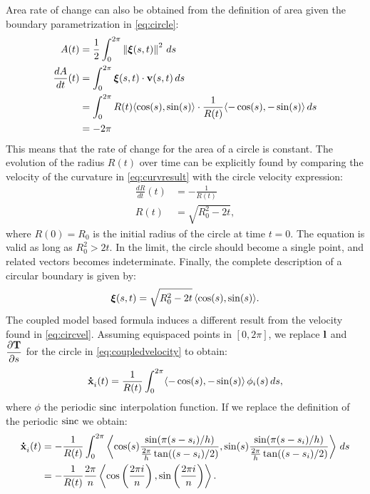 Area rate of change can also be obtained from the definition of area given the boundary parametrization in \eqref{eq:circle}:
\begin{align}
    A(t) &= \frac{1}{2} \int_0^{2\pi} \left\lVert\bm{\xi}(s,t)\right\rVert^2\, ds\nonumber\\
    \dfrac{dA}{dt}(t) &= \int_0^{2\pi} \bm{\xi}(s,t)\cdot \mathbf{v}(s,t)\,ds \nonumber\\
    &= \int_0^{2\pi} R(t)\langle \cos(s),\sin(s)\rangle \cdot \frac{1}{R(t)} \langle -\cos(s),-\sin(s)\rangle \,ds \nonumber\\
    &= -2\pi \label{eq:dAdtcircle}
\end{align}
This means that the rate of change for the area of a circle is constant. The evolution of the radius $R(t)$ over time can be explicitly found by comparing the velocity of the curvature in \eqref{eq:curvresult} with the circle velocity expression:
\begin{align}
    \frac{dR}{dt}(t) &= -\frac{1}{R(t)} \label{eq:circvel}\\
    R(t) &= \sqrt{R_0^2 - 2t} \label{eq:radii},
\end{align}
where $R(0) = R_0$ is the initial radius of the circle at time $t=0$. The equation is valid as long as $R_0^2 > 2t$. In the limit, the circle should become a single point, and related vectors becomes indeterminate. Finally, the complete description of a circular boundary is given by:
\begin{equation}
    \bm{\xi}(s,t) = \sqrt{R_0^2 - 2t}\,\langle \cos(s), \sin(s) \rangle.
\end{equation}
The coupled model based formula induces a different result from the velocity found in \eqref{eq:circvel}. Assuming equispaced points in $[0, 2\pi]$, we replace $\mathbf{l}$ and $\dfrac{\partial \mathbf{T}}{\partial s}$ for the circle in \eqref{eq:coupledvelocity} to obtain:
\begin{equation}
    \dotx[i](t) = \frac{1}{R(t)} \int_0^{2\pi}  \langle -\cos(s), -\sin(s)\rangle \,\phi_i(s)\, ds,
\end{equation}
where $\phi$ the periodic $\operatorname{sinc}$ interpolation function. If we replace the definition of the periodic $\operatorname{sinc}$ we obtain:
\begin{align}
    \dotx[i](t) &= -\frac{1}{R(t)} \int_0^{2\pi} \left\langle \cos(s)\frac{\sin(\pi(s-s_i) / h)}{\frac{2\pi}{h} \tan((s-s_i)/2)}, \sin(s)\frac{\sin(\pi(s-s_i) / h)}{\frac{2\pi}{h} \tan((s-s_i)/2)} \right\rangle\,ds\\
    &= -\frac{1}{R(t)}  \frac{2\pi}{n}\left\langle\cos \left(\frac{2\pi i}{n}\right), \sin\left(\frac{2\pi i }{n}\right)\right\rangle.
    \label{eq:curvaturevelocity}
\end{align}

